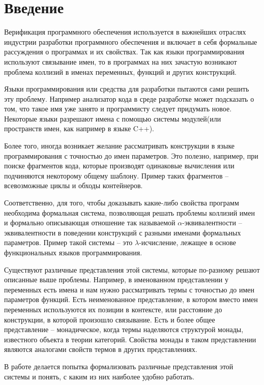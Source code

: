 \section*{Введение}

Верификация программного обеспечения используется в важнейших отраслях индустрии разработки программного обеспечения и включает в себя формальные рассуждения о программах и их свойствах. Так как языки программирования используют связывание имен, то в программах на них зачастую возникают проблема коллизий в именах переменных, функций и других конструкций.

Языки программирования или средства для разработки пытаются сами решить эту проблему. Например анализатор кода в среде разработке может подсказать о том, что такое имя уже занято и программисту следует придумать новое. Некоторые языки разрешают имена с помощью системы модулей(или пространств имен, как например в языке C++).

Более того, иногда возникает желание рассматривать конструкции в языке программирования с точностью до имен параметров. Это полезно, например, при поиске фрагментов кода, которые производят одинаковые вычисления или подчиняются некоторому общему шаблону. Пример таких фрагментов -- всевозможные циклы и обходы контейнеров.

Соответственно, для того, чтобы доказывать какие-либо свойства программ необходима формальная система, позволяющая решать проблемы коллизий имен и формально описывающая отношение так называемой $\alpha$-эквивалентности -- эквивалентности в поведении конструкций с разными именами формальных параметров. Пример такой системы -- это $\lambda$-исчисление, лежащее в основе функциональных языков программирования.

Существуют различные представления этой системы, которые по-разному решают описанные выше проблемы. Например, в именованном представлении у переменных есть имена и нам нужно рассматривать термы с точностью до имен параметров функций. Есть неименованное представление, в котором вместо имен переменных используются их позиции в контексте, или расстояние до конструкции, в которой произошло связывание. Есть и более общее представление -- монадическое, когда термы наделяются структурой монады, известного объекта в теории категорий. Свойства монады в таком представлении являются аналогами свойств термов в других представлениях.

В работе делается попытка формализовать различные представления этой системы и понять, с каким из них наиболее удобно работать.

